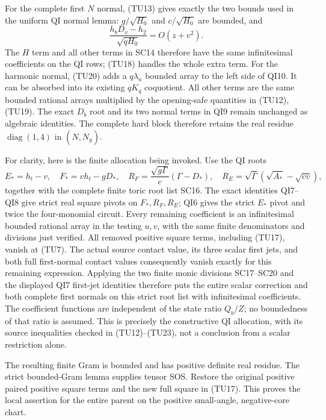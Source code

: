For the complete first $N$ normal, (TU13) gives exactly the two
bounds used in the uniform QI normal lemma:
$g/\sqrt{H_0}$ and $c/\sqrt{H_0}$ are bounded, and
\[
 \frac{h_bD_v-h_2}{\sqrt{qH_0}}=O(z+v^2).
                                                               \tag{TU23}
\]
The $H$ term and all other terms in SC14 therefore have the same
infinitesimal coefficients on the QI rows; (TU18) handles the whole
extra term.  For the harmonic normal, (TU20) adds a
$q\lambda_n$ bounded array to the left side of QI10.  It can be
absorbed into its existing $qK_q$ coquotient.  All other terms are
the same bounded rational arrays multiplied by the opening-safe
quantities in (TU12), (TU19).  The exact $D_b$ root and its two
normal terms in QI9 remain unchanged as algebraic identities.
The complete hard block therefore retains the real residue
$\operatorname{diag}(1,4)$ in $(\widehat N,N_y)$.

For clarity, here is the finite allocation being invoked.  Use
the QI roots
\[
 E_*=h_t-v,\quad F_*=vh_t-gD_*,\quad
 R_F=\frac{\sqrt{g\Gamma}}c(\Gamma-D_*),\quad
 R_E=\sqrt\Gamma(\sqrt{A_*}-\sqrt{cv}),
\]
together with the complete finite toric root list SC16.
The exact identities QI7--QI8 give strict real square pivots on
$F_*,R_F,R_E$; QI6 gives the strict $E_*$ pivot and twice the
four-monomial circuit.  Every remaining coefficient is an
infinitesimal bounded rational array in the testing $u,v$, with
the same finite denominators and divisions just verified.
All removed positive square terms, including (TU17), vanish at (TU7).
The actual source contact value, its three scalar first jets,
and both full first-normal contact values consequently vanish
exactly for this remaining expression.  Applying the two finite
monic divisions SC17--SC20 and the displayed QI7 first-jet
identities therefore puts the entire scalar correction and
both complete first normals on this strict root list with
infinitesimal coefficients.  The coefficient functions are
independent of the state ratio $Q_b/Z$; no boundedness of that
ratio is assumed.  This is precisely the constructive QI
allocation, with its source inequalities checked in
(TU12)--(TU23), not a conclusion from a scalar restriction alone.

The resulting finite Gram is bounded and has positive definite
real residue.  The strict bounded-Gram lemma supplies tensor SOS.
Restore the original positive paired positive square terms and the new full
square in (TU17).  This proves the local assertion for the entire
parent on the positive small-angle, negative-core chart.

